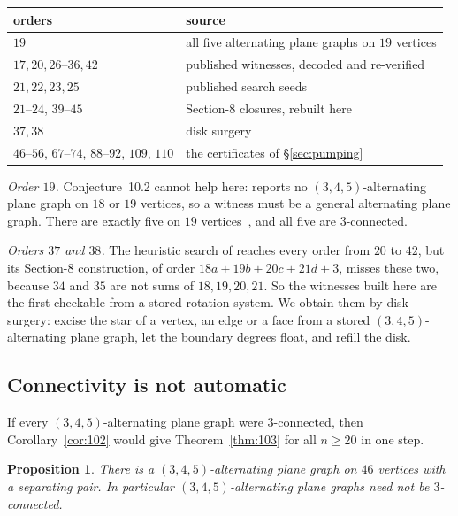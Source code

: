 \documentclass[11pt,a4paper]{amsart}
\theoremstyle{plain}
\newtheorem{proposition}[theorem]{Proposition}
\theoremstyle{definition}
\begin{document}
\begin{center}
\begin{tabular}{ll}
\toprule
orders & source \\
\midrule
$19$ & all five alternating plane graphs on $19$ vertices \\
$17, 20, 26$--$36, 42$ & published witnesses, decoded and re-verified \\
$21, 22, 23, 25$ & published search seeds \\
$21$--$24$, $39$--$45$ & Section-8 closures, rebuilt here \\
$37, 38$ & disk surgery \\
$46$--$56$, $67$--$74$, $88$--$92$, $109$, $110$ & the certificates of \S\ref{sec:pumping} \\
\bottomrule
\end{tabular}
\end{center}

\emph{Order $19$.} Conjecture~10.2 cannot help here: \cite{AHSSV2015} reports
no $(3,4,5)$-alternating plane graph on $18$ or $19$ vertices, so a witness must
be a general alternating plane graph. There are exactly five on
$19$ vertices~\cite{HoG}, and all five are $3$-connected.

\emph{Orders $37$ and $38$.} The heuristic search of \cite{AHSSV2015} reaches
every order from $20$ to $42$, but its Section-8 construction, of order
$18a+19b+20c+21d+3$, misses these two, because $34$ and $35$ are not sums of
$18,19,20,21$. So the witnesses built here are the first checkable from a stored
rotation system. We obtain them by disk surgery: excise the star of a vertex, an
edge or a face from a stored $(3,4,5)$-alternating plane graph, let the boundary
degrees float, and refill the disk.

\subsection{Connectivity is not automatic}

If every $(3,4,5)$-alternating plane graph were $3$-connected, then
Corollary~\ref{cor:102} would give Theorem~\ref{thm:103} for all $n \ge 20$ in
one step.

\begin{proposition}\label{prop:not3conn}
There is a $(3,4,5)$-alternating plane graph on $46$ vertices with a separating
pair. In particular $(3,4,5)$-alternating plane graphs need not be
$3$-connected.
\end{proposition}
\end{document}

